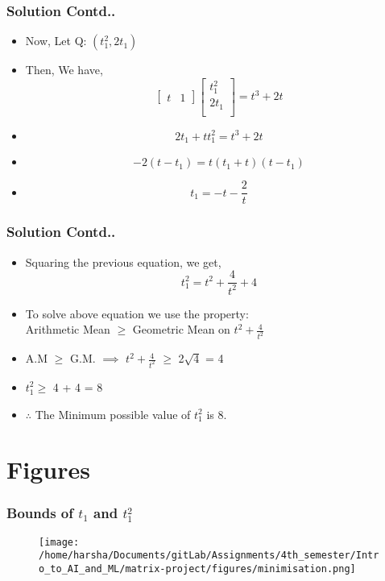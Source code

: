 \documentclass[12pt]{beamer}
\begin{document}

\begin{frame}
\frametitle{Solution Contd..}
\begin{itemize}
\item<1-5> Now, Let Q: $( t_1^2, 2t_1 )$
\item<2-5> Then, We have,
\[
\begin{bmatrix}
    t & 1  
\end{bmatrix}
\begin{bmatrix}
    t_1^2\\
    2t_1\\  
\end{bmatrix} = 
t^3 + 2t
\]
\item<3-5> \[
2t_1 + tt_1^2 = t^3 + 2t 
\]
\item<4-5>
\[
-2(t - t_1) = t(t_1 + t)(t - t_1)
\]
\item<5>
\[
t_1 = -t - \frac{2}{t}
\]
\end{itemize}
\end{frame}



\begin{frame}
\frametitle{Solution Contd..}
\begin{itemize}
\item<1-5>
Squaring the previous equation, we get,
\[
t_1^2 = t^2 + \frac{4}{t^2} + 4
\]
\item<2-5> To solve above equation we use the property:\\
Arithmetic Mean $\geq$ Geometric Mean on $t^2 + \frac{4}{t^2}$
\item<3-5> A.M $\geq$ G.M. $\implies$ $t^2 + \frac{4}{t^2}$ $\geq$ 2$\sqrt{4}$ = 4
\item<4-5> $t_1^2 \geq$ 4 + 4 = 8
\item<5> $\therefore$ The Minimum possible value of $t_1^2$ is 8.
\end{itemize}
\end{frame}

\section{Figures}

\begin{frame}
\frametitle{Bounds of $t_1$ and $t_1^2$}
\begin{figure}
\centering
\texttt{[image: /home/harsha/Documents/gitLab/Assignments/4th\_semester/Intro\_to\_AI\_and\_ML/matrix-project/figures/minimisation.png]}
\label{Bounds of $t_1$ and $t_1^2$}
\end{figure}
\end{frame}
\end{document}
